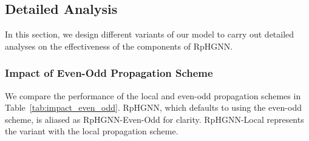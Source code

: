 \documentclass[lettersize,journal]{IEEEtran}
\begin{document}
\begin{table*}[!tp]
  \centering
  \caption{Performance comparison of the local propagation scheme (with $2K$ iterations) and the even-odd propagation scheme (with $K$ iterations). Either of them can capture relations within $2K$ hops.}
  
  \label{tab:impact_even_odd}
  \end{table*}









\subsection{Detailed Analysis}


In this section, we design different variants of our model to carry out detailed analyses on the effectiveness of the components of RpHGNN.



\subsubsection{Impact of Even-Odd Propagation Scheme}

We compare the performance of the local and even-odd propagation schemes in Table~\ref{tab:impact_even_odd}.
RpHGNN, which defaults to using the even-odd scheme, is aliased as RpHGNN-Even-Odd for clarity.
RpHGNN-Local represents the variant with the local propagation scheme.
\end{document}
